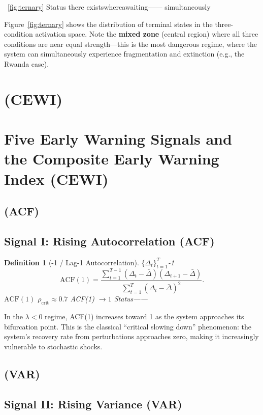 \documentclass[11pt,a4paper]{article}
\newtheorem{definition}[theorem]{Definition}
\theoremstyle{remark}
\newcommand{\ineq}{\Delta}
\newcommand{\lambdaparam}{\lambda}
\begin{document}
~\ref{fig:ternary} Status
there exists\textbf{}whereawaiting——
simultaneously

Figure~\ref{fig:ternary} shows the distribution of terminal states in the three-condition
activation space. Note the \textbf{mixed zone} (central region) where all three conditions
are near equal strength—this is the most dangerous regime, where the system can
simultaneously experience fragmentation and extinction (e.g., the Rwanda case).

\section{ (CEWI)}
\section{Five Early Warning Signals and the Composite Early Warning Index (CEWI)}

\subsection{ (ACF)}
\subsection{Signal I: Rising Autocorrelation (ACF)}

\begin{definition}[-1  / Lag-1 Autocorrelation]
\label{def:acf}
 $\{\ineq_t\}_{t=1}^{T}$-1 
\[
\text{ACF}(1) = \frac{\sum_{t=1}^{T-1} (\ineq_t - \bar{\ineq})(\ineq_{t+1} - \bar{\ineq})}
                      {\sum_{t=1}^{T} (\ineq_t - \bar{\ineq})^2}.
\]
\textbf{} $\text{ACF}(1)$ 
$\rho_{\text{crit}} \approx 0.7$ 
 ACF(1) $\to 1$ \textbf{}Status——

\end{definition}

In the $\lambdaparam < 0$ regime, ACF(1) increases toward 1 as the system approaches
its bifurcation point. This is the classical ``critical slowing down'' phenomenon:
the system's recovery rate from perturbations approaches zero, making it increasingly
vulnerable to stochastic shocks.

\subsection{ (VAR)}
\subsection{Signal II: Rising Variance (VAR)}
\end{document}
